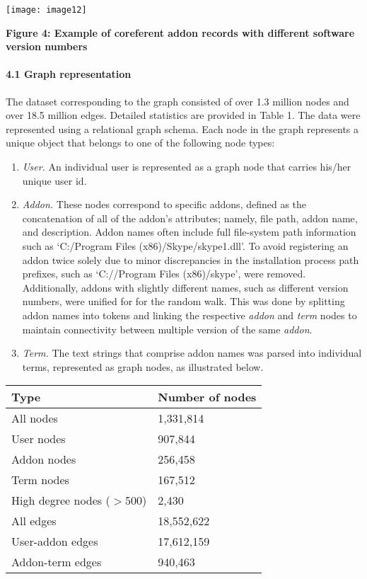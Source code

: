 \documentclass{article} %
\begin{document}
\noindent \texttt{[image: image12]}

\noindent \textbf{Figure 4: Example of coreferent addon records with different software version numbers}






\paragraph{4.1  Graph representation}

 The dataset corresponding to the graph consisted of over 1.3 million nodes and over 18.5 million edges. Detailed statistics are provided in Table 1. The data were represented using a relational graph schema. Each node in the graph represents a unique object that belongs to one of the following node types:   

\begin{enumerate}
\item  \textit{User. } An individual user is represented as a graph node that carries his/her unique user id. 

\item  \textit{Addon.  }These nodes correspond to specific addons, defined as the concatenation of all of the addon's attributes; namely, file path, addon name, and description. Addon names often include full file-system path information such as `C:/Program Files (x86)/Skype/skype1.dll'. To avoid registering an addon twice solely due to minor discrepancies in the installation process path prefixes, such as `C://Program Files (x86)/skype', were removed. Additionally, addons with slightly different names, such as different version numbers, were unified for for the random walk. This was done by splitting addon names into tokens and linking the respective \textit{addon} and \textit{term} nodes to maintain connectivity between multiple version of the same \textit{addon}. 

\item  \textit{Term.  }The text strings that comprise addon names was parsed into individual terms, represented as graph nodes, as illustrated below. 
\end{enumerate}

\noindent 

\begin{tabular}{|p{2.2in}|p{1.1in}|} \hline 
 \textbf{Type}  & \textbf{Number of nodes} \\ \hline 
All nodes  & 1,331,814 \\ \hline 
User nodes  & 907,844 \\ \hline 
Addon nodes  & 256,458 \\ \hline 
Term nodes  & 167,512 \\ \hline 
High degree nodes ($>$500)  & 2,430 \\ \hline 
All edges  & 18,552,622 \\ \hline 
User-addon edges  & 17,612,159 \\ \hline 
Addon-term edges  & 940,463 \\ \hline 
\end{tabular}
\end{document}

